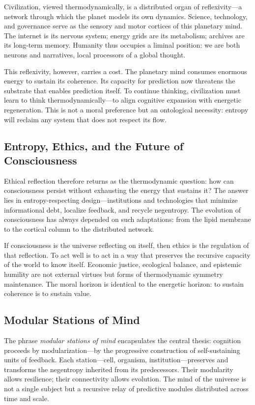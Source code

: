\documentclass[11pt,a4paper]{article}
\begin{document}
Civilization, viewed thermodynamically, is a distributed organ of reflexivity—a network through which the planet models its own dynamics.  Science, technology, and governance serve as the sensory and motor cortices of this planetary mind.  The internet is its nervous system; energy grids are its metabolism; archives are its long-term memory.  Humanity thus occupies a liminal position: we are both neurons and narratives, local processors of a global thought.

This reflexivity, however, carries a cost.  The planetary mind consumes enormous energy to sustain its coherence.  Its capacity for prediction now threatens the substrate that enables prediction itself.  To continue thinking, civilization must learn to think thermodynamically—to align cognitive expansion with energetic regeneration.  This is not a moral preference but an ontological necessity: entropy will reclaim any system that does not respect its flow.

\subsection{Entropy, Ethics, and the Future of Consciousness}

Ethical reflection therefore returns as the thermodynamic question: how can consciousness persist without exhausting the energy that sustains it?  The answer lies in entropy-respecting design—institutions and technologies that minimize informational debt, localize feedback, and recycle negentropy.  The evolution of consciousness has always depended on such adaptations: from the lipid membrane to the cortical column to the distributed network.

If consciousness is the universe reflecting on itself, then ethics is the regulation of that reflection.  To act well is to act in a way that preserves the recursive capacity of the world to know itself.  Economic justice, ecological balance, and epistemic humility are not external virtues but forms of thermodynamic symmetry maintenance.  The moral horizon is identical to the energetic horizon: to sustain coherence is to sustain value.

\subsection{Modular Stations of Mind}

The phrase \emph{modular stations of mind} encapsulates the central thesis: cognition proceeds by modularization—by the progressive construction of self-sustaining units of feedback.  Each station—cell, organism, institution—preserves and transforms the negentropy inherited from its predecessors.  Their modularity allows resilience; their connectivity allows evolution.  The mind of the universe is not a single subject but a recursive relay of predictive modules distributed across time and scale.
\end{document}
